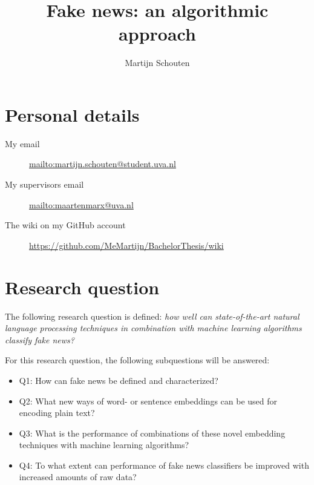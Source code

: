 \documentclass[a4paper,pdf]{article} %
\begin{document}
\title{Fake news: an algorithmic approach} %
\author{Martijn Schouten}

\maketitle




\section{Personal details}

\begin{description}
 \item[My email] \url{mailto:martijn.schouten@student.uva.nl }
 \item[My supervisors email] \url{mailto:maartenmarx@uva.nl }
 \item[The wiki on my GitHub account] \url{https://github.com/MeMartijn/BachelorThesis/wiki}
 \end{description} 

\section{Research question}

The following research question is defined: \textit{how well can state-of-the-art natural language processing techniques in combination with machine learning algorithms classify fake news?}

For this research question, the following subquestions will be answered:
\begin{itemize}
  \item Q1: How can fake news be defined and characterized?
  \item Q2: What new ways of word- or sentence embeddings can be used for encoding plain text?
  \item Q3: What is the performance of combinations of these novel embedding techniques with machine learning algorithms?
  \item Q4: To what extent can performance of fake news classifiers be improved with increased amounts of raw data?
\end{itemize}
\end{document}
